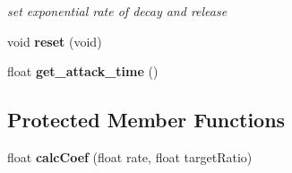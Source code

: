 \begin{DoxyCompactItemize}
\begin{DoxyCompactList}\small\item\em set exponential rate of decay and release \end{DoxyCompactList}\item 
void {\bfseries reset} (void)\hypertarget{class_a_d_s_r_a82e4d4030c9a14edf8e5693fd9051c29}{}\label{class_a_d_s_r_a82e4d4030c9a14edf8e5693fd9051c29}

\item 
float {\bfseries get\+\_\+attack\+\_\+time} ()\hypertarget{class_a_d_s_r_af9985eedd297d59d632e22788af86d7b}{}\label{class_a_d_s_r_af9985eedd297d59d632e22788af86d7b}

\end{DoxyCompactItemize}
\subsection*{Protected Member Functions}
\begin{DoxyCompactItemize}
\item 
float {\bfseries calc\+Coef} (float rate, float target\+Ratio)\hypertarget{class_a_d_s_r_ae088324f9aaae8b3c30973f548c34b1b}{}\label{class_a_d_s_r_ae088324f9aaae8b3c30973f548c34b1b}

\end{DoxyCompactItemize}
